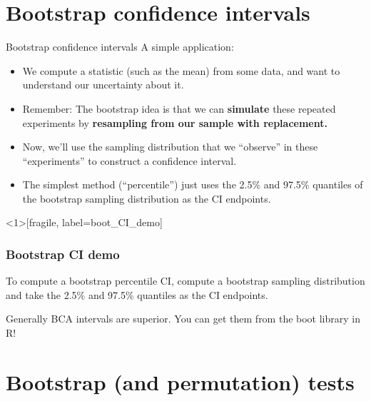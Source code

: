 \documentclass{beamer} %
\begin{document}
\section{Bootstrap confidence intervals}

\begin{frame}{Bootstrap confidence intervals}
A simple application:
\begin{itemize}[<+(1)->] \itemsep 1em
\item We compute a statistic (such as the mean) from some data, and want to understand our uncertainty about it.
\item Remember: The bootstrap idea is that we can \textbf{simulate} these repeated experiments by \textbf{resampling from our sample with replacement.}
\item Now, we'll use the sampling distribution that we ``observe'' in these ``experiments'' to construct a confidence interval.
\item The simplest method (``percentile'') just uses the 2.5\% and 97.5\% quantiles of the bootstrap sampling distribution as the CI endpoints.
\end{itemize}
\end{frame}

\begin{frame}<1>[fragile, label=boot_CI_demo]
\frametitle{Bootstrap CI demo}
\begin{figure}
\centering
{}
\end{figure}
\end{frame}

\begin{frame}[standout]
To compute a bootstrap percentile CI, compute a bootstrap sampling distribution and take the 2.5\% and 97.5\% quantiles as the CI endpoints.
\end{frame}


\begin{frame}[standout]
Generally BCA intervals are superior. You can get them from the boot library in R!
\end{frame}

\section{Bootstrap (and permutation) tests}
\end{document}
